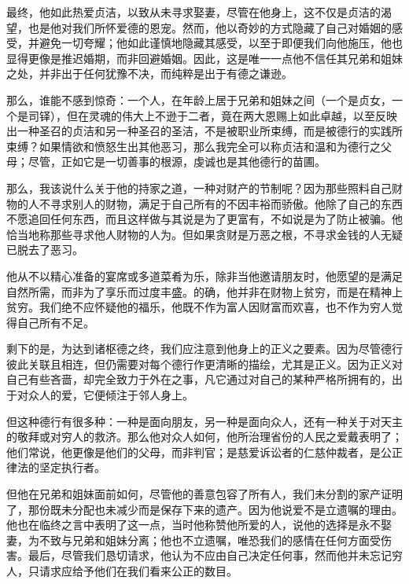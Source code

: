 最终，他如此热爱贞洁，以致从未寻求娶妻，尽管在他身上，这不仅是贞洁的渴望，也是他对我们所怀爱德的恩宠。然而，他以奇妙的方式隐藏了自己对婚姻的感受，并避免一切夸耀；他如此谨慎地隐藏其感受，以至于即便我们向他施压，他也显得更像是推迟婚期，而非回避婚姻。因此，这是唯一一点他不信任其兄弟和姐妹之处，并非出于任何犹豫不决，而纯粹是出于有德之谦逊。\par

那么，谁能不感到惊奇：一个人，在年龄上居于兄弟和姐妹之间（一个是贞女，一个是司铎），但在灵魂的伟大上不逊于二者，竟在两大恩赐上如此卓越，以至反映出一种圣召的贞洁和另一种圣召的圣洁，不是被职业所束缚，而是被德行的实践所束缚？如果情欲和愤怒生出其他恶习，那么我完全可以称贞洁和温和为德行之父母；尽管，正如它是一切善事的根源，虔诚也是其他德行的苗圃。\par

那么，我该说什么关于他的持家之道，一种对财产的节制呢？因为那些照料自己财物的人不寻求别人的财物，满足于自己所有的不因丰裕而骄傲。他除了自己的东西不愿追回任何东西，而且这样做与其说是为了更富有，不如说是为了防止被骗。他恰当地称那些寻求他人财物的人为。但如果贪财是万恶之根，不寻求金钱的人无疑已脱去了恶习。\par

他从不以精心准备的宴席或多道菜肴为乐，除非当他邀请朋友时，他愿望的是满足自然所需，而非为了享乐而过度丰盛。的确，他并非在财物上贫穷，而是在精神上贫穷。我们绝不应怀疑他的福乐，他既不作为富人因财富而欢喜，也不作为穷人觉得自己所有不足。\par

剩下的是，为达到诸枢德之终，我们应注意到他身上的正义之要素。因为尽管德行彼此关联且相连，但仍需要对每个德行作更清晰的描绘，尤其是正义。因为正义对自己有些吝啬，却完全致力于外在之事，凡它通过对自己的某种严格所拥有的，出于对众人的爱，它便倾注于邻人身上。\par

但这种德行有很多种：一种是面向朋友，另一种是面向众人，还有一种关于对天主的敬拜或对穷人的救济。那么他对众人如何，他所治理省份的人民之爱戴表明了；他们常说，他更像是他们的父母，而非判官；是慈爱诉讼者的仁慈仲裁者，是公正律法的坚定执行者。\par

但他在兄弟和姐妹面前如何，尽管他的善意包容了所有人，我们未分割的家产证明了，那份既未分配也未减少而是保存下来的遗产。因为他说爱不是立遗嘱的理由。他也在临终之言中表明了这一点，当时他称赞他所爱的人，说他的选择是永不娶妻，为不致与兄弟和姐妹分离；他也不立遗嘱，唯恐我们的感情在任何方面受伤害。最后，尽管我们恳切请求，他认为不应由自己决定任何事，然而他并未忘记穷人，只请求应给予他们在我们看来公正的数目。\par

